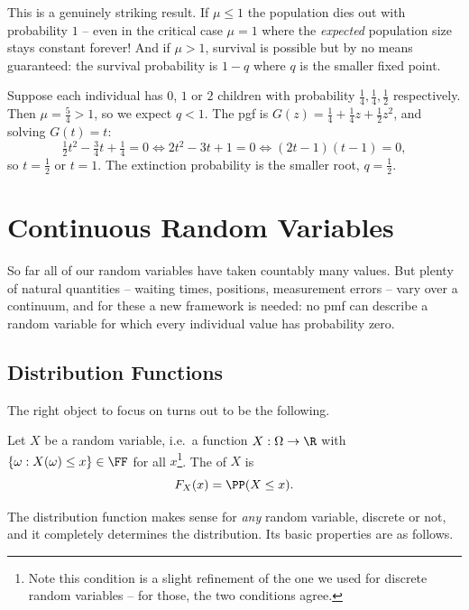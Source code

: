 This is a genuinely striking result. If $\mu \leq 1$ the population dies out with probability $1$ -- even in the critical case $\mu = 1$ where the \emph{expected} population size stays constant forever! And if $\mu > 1$, survival is possible but by no means guaranteed: the survival probability is $1 - q$ where $q$ is the smaller fixed point.

\begin{example}
	Suppose each individual has $0$, $1$ or $2$ children with probability $\frac14, \frac14, \frac12$ respectively. Then $\mu = \frac54 > 1$, so we expect $q < 1$. The pgf is $G(z) = \frac14 + \frac14 z + \frac12 z^2$, and solving $G(t) = t$:
	$$
	\tfrac12 t^2 - \tfrac34 t + \tfrac14 = 0 \iff 2t^2 - 3t + 1 = 0 \iff (2t - 1)(t - 1) = 0,
	$$
	so $t = \frac12$ or $t = 1$. The extinction probability is the smaller root, $q = \frac{1}{2}$.
\end{example}


\section{Continuous Random Variables}

So far all of our random variables have taken countably many values. But plenty of natural quantities -- waiting times, positions, measurement errors -- vary over a continuum, and for these a new framework is needed: no pmf can describe a random variable for which every individual value has probability zero.

\subsection{Distribution Functions}

The right object to focus on turns out to be the following.

\begin{definition}
	Let $X$ be a random variable, i.e.\ a function $X: \Omega \rightarrow \R$ with $\{\omega : X(\omega) \leq x\} \in \FF$ for all $x$\footnote{Note this condition is a slight refinement of the one we used for discrete random variables -- for those, the two conditions agree.}. The  of $X$ is
	$$
	F_X(x) = \PP(X \leq x).
	$$
\end{definition}

The distribution function makes sense for \emph{any} random variable, discrete or not, and it completely determines the distribution. Its basic properties are as follows.

